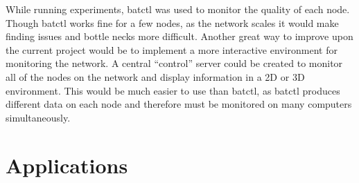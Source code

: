 While running experiments, batctl was used to monitor the quality of each node. Though batctl works fine for a few nodes, as the network scales it would make finding issues and bottle necks more difficult. Another great way to improve upon the current project would be to implement a more interactive environment for monitoring the network. A central ``control'' server could be created to monitor all of the nodes on the network and display information in a 2D or 3D environment. This would be much easier to use than batctl, as batctl produces different data on each node and therefore must be monitored on many computers simultaneously. 

\section{Applications}

